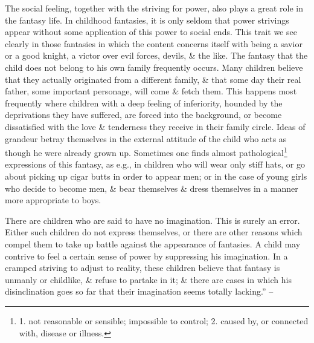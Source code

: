 \documentclass{article}
\begin{document}
The social feeling, together with the striving for power, also plays a great role in the fantasy life. In childhood fantasies, it is only seldom that power strivings appear without some application of this power to social ends. This trait we see clearly in those fantasies in which the content concerns itself with being a savior or a good knight, a victor over evil forces, devils, \& the like. The fantasy that the child does not belong to his own family frequently occurs. Many children believe that they actually originated from a different family, \& that some day their real father, some important personage, will come \& fetch them. This happens most frequently where children with a deep feeling of inferiority, hounded by the deprivations they have suffered, are forced into the background, or become dissatisfied with the love \& tenderness they receive in their family circle. Ideas of grandeur betray themselves in the external attitude of the child who acts as though he were already grown up. Sometimes one finds almost pathological\footnote{1. not reasonable or sensible; impossible to control; 2. caused by, or connected with, disease or illness.} expressions of this fantasy, as e.g., in children who will wear only stiff hats, or go about picking up cigar butts in order to appear men; or in the case of young girls who decide to become men, \& bear themselves \& dress themselves in a manner more appropriate to boys.

There are children who are said to have no imagination. This is surely an error. Either such children do not express themselves, or there are other reasons which compel them to take up battle against the appearance of fantasies. A child may contrive to feel a certain sense of power by suppressing his imagination. In a cramped striving to adjust to reality, these children believe that fantasy is unmanly or childlike, \& refuse to partake in it; \& there are cases in which his disinclination goes so far that their imagination seems totally lacking.'' -- \cite[pp. 57--59]{Adler_human_nature}
\end{document}
